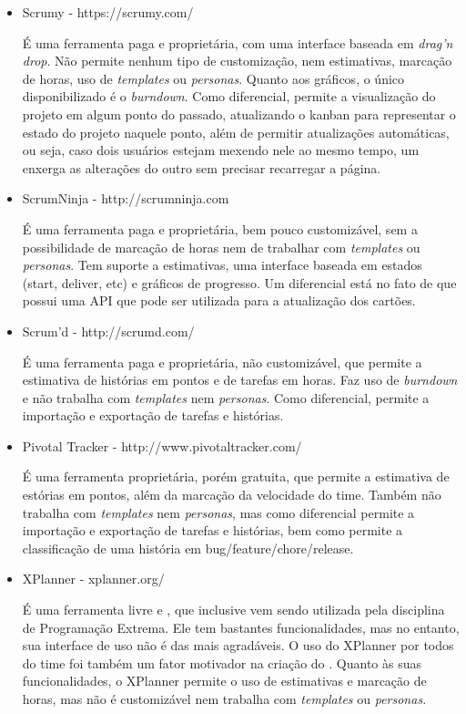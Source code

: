\begin{itemize}
\item{Scrumy - https://scrumy.com/

É uma ferramenta paga e proprietária, com uma interface baseada em \textit{drag'n drop}. Não permite nenhum tipo de
customização, nem estimativas, marcação de horas, uso de \textit{templates} ou \textit{personas}. Quanto aos gráficos, o único disponibilizado
é o \textit{burndown}. Como diferencial, permite a visualização do
projeto em algum ponto do passado, atualizando o kanban para representar o estado do projeto naquele ponto, além de
permitir atualizações automáticas, ou seja, caso dois usuários estejam mexendo nele ao mesmo tempo, um enxerga as alterações
do outro sem precisar recarregar a página.}

\item{ScrumNinja - http://scrumninja.com

É uma ferramenta paga e proprietária, bem pouco customizável, sem a possibilidade de marcação de horas nem de
trabalhar com \textit{templates} ou \textit{personas}. Tem suporte a estimativas, uma interface baseada em estados (start, deliver, etc) e
gráficos de progresso. Um diferencial está no fato de que possui uma API que pode ser utilizada para a atualização dos cartões.}

\item{Scrum'd - http://scrumd.com/

É uma ferramenta paga e proprietária, não customizável, que permite a estimativa de histórias em pontos e de tarefas
em horas. Faz uso de \textit{burndown} e não trabalha com \textit{templates} nem \textit{personas}. Como diferencial, permite a importação e exportação de tarefas e histórias.}

\item{Pivotal Tracker - http://www.pivotaltracker.com/

É uma ferramenta proprietária, porém gratuita, que permite a estimativa de estórias em pontos, além da marcação da velocidade do time. Também não trabalha com \textit{templates} nem \textit{personas}, mas como diferencial permite a importação e exportação de tarefas e histórias, bem como permite a classificação de uma história em bug/feature/chore/release.}

\item{XPlanner - xplanner.org/

É uma ferramenta livre e \opensource{}, que inclusive vem sendo utilizada pela disciplina de Programação Extrema.
Ele tem bastantes funcionalidades, mas no entanto, sua interface de uso não é das mais agradáveis. O uso do XPlanner
por todos do time foi também um fator motivador na criação do \calopsita{}. Quanto às suas funcionalidades, o XPlanner
permite o uso de estimativas e marcação de horas, mas não é customizável nem trabalha com \textit{templates} ou \textit{personas}.}


\end{itemize}

